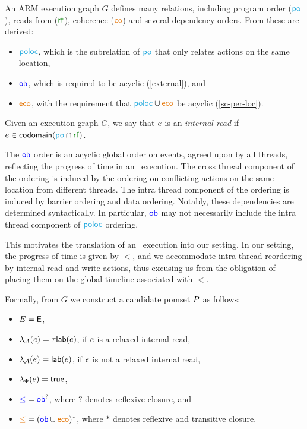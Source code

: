 An ARM execution graph $G$ defines many relations, including program order
($\rpox$), reads-from ($\rrfx$), coherence ($\rco$) and several dependency
orders.  From these are derived:
\begin{itemize}
\item ${\rpoloc}$, which is the subrelation of $\rpox$ that only relates
  actions on the same location,
\item ${\mathrel{\color{blue}\mathsf{ob}}}$, which is required to be acyclic (\ref{external}), and
\item $\reco$, with the requirement that ${\rpoloc}\cup{\reco}$ be acyclic (\ref{sc-per-loc}).
\end{itemize}
Given an execution graph $G$, we say that $e$ is an \emph{internal read} if $\aEv\in\fcodom({\rpox}\cap {\rrfx})$.

The ${\mathrel{\color{blue}\mathsf{ob}}}$ order is an acyclic global order on events, agreed upon by all threads, reflecting the progress of time in an \armeight\ execution.  The cross thread component of the ordering is induced by the ordering on conflicting actions on the same location from different threads.    The intra thread component of the ordering is induced by barrier ordering and data ordering.  Notably, these dependencies  are determined syntactically.  In particular, $\mathrel{\color{blue}\mathsf{ob}}$
may not necessarily include the intra thread component of $\rpoloc$ ordering.  

This motivates the translation of an \armeight\ execution into our setting.  In our setting, the progress of time is given by $\lt$, and we accommodate intra-thread reordering by internal read and write actions, thus excusing us from the obligation of placing them on the global timeline associated with $\lt$.  

Formally, from $G$ we construct a candidate pomset $P$ as follows:
\begin{itemize}
\item $E= \textsf{E}$,
\item $\lambda_{\mathcal{A}}(e)=\tau \mathsf{lab}(e)$, if $e$ is a relaxed
  internal read, 
\item $\lambda_{\mathcal{A}}(e)=\mathsf{lab}(e)$, if $e$ is not a relaxed
  internal read,
\item $\lambda_{\Phi}(e)=\mathsf{true}$,
\item ${\mathrel{{\color{blue}\leq}}} = {\mathrel{\color{blue}\mathsf{ob}}}^?$, where $?$ denotes reflexive closure, and
\item ${\gtN} = ({\rob} \cup {\reco})^*$, where $*$ denotes reflexive and transitive closure.
\end{itemize}


